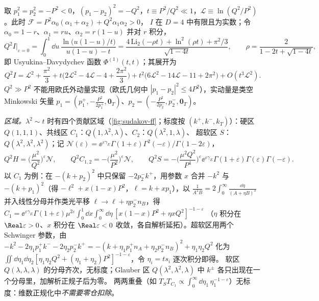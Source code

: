 \begin{example}\label{ex:sudakov-offshell}
取 $p_1^2=p_2^2=-P^2<0$，$(p_1-p_2)^2=-Q^2$，$t\equiv P^2/Q^2\ll1$，$\mathcal L\equiv\ln(Q^2/P^2)$。此时 $\mathcal F=P^2\alpha_0(\alpha_1+\alpha_2)+Q^2\alpha_1\alpha_2>0$，
$I$ 在 $D=4$ 中有限且为实数；令 $\alpha_0=1-r$、$\alpha_1=ru$、$\alpha_2=r(1-u)$ 并对 $r$ 积分，
\begin{equation}\label{eq:sudakov-offshell-exact}
Q^2I\big|_{\varepsilon=0}=\int_0^1\!\dd u\,\frac{\ln\big(u(1-u)/t\big)}{u(1-u)-t}
=\frac{4\,\mathrm{Li}_2(-\rho t)+\ln^2(\rho t)+\pi^2/3}{\sqrt{1-4t}},\qquad\rho=\frac{2}{1-2t+\sqrt{1-4t}},
\end{equation}
即 Usyukina--Davydychev 函数 $\Phi^{(1)}(t,t)$\cite{UsyukinaDavydychev1993a}；其展开为
\begin{equation}\label{eq:sudakov-offshell-nlp}
Q^2I=\mathcal L^2+\frac{\pi^2}3+t\Big(2\mathcal L^2-4\mathcal L-4+\frac{2\pi^2}3\Big)+t^2\big(6\mathcal L^2-14\mathcal L-11+2\pi^2\big)+O(t^3\mathcal L^2).
\end{equation}
$Q^2\gg P^2$ 不能用欧氏外动量实现（欧氏几何中 $|p_1-p_2|^2\le4P^2$），实动量是类空 Minkowski 矢量 $p_1=(p_1^+,-\frac{P^2}{2p_1^+},\mathbf 0_T)$、$p_2=(-\frac{P^2}{2p_2^-},p_2^-,\mathbf 0_T)$。

\emph{区域。}$\lambda^2\sim t$ 时有四个贡献区域（\cref{fig:sudakov-ff}；标度按 $(k^+,k^-,k_T)$）：硬区 $Q(1,1,1)$、共线区 $C_1$：$Q(1,\lambda^2,\lambda)$、$C_2$：$Q(\lambda^2,1,\lambda)$、
超软区 $S$：$Q(\lambda^2,\lambda^2,\lambda^2)$；记 $\mathcal N(\varepsilon)=\ee^{\varepsilon\gamma_E}\Gamma(1+\varepsilon)\Gamma^2(-\varepsilon)/\Gamma(1-2\varepsilon)$，
\begin{equation}\label{eq:sudakov-regions}
Q^2H=\Big(\frac{\mu^2}{Q^2}\Big)^{\varepsilon}\mathcal N,\qquad Q^2C_{1,2}=-\Big(\frac{\mu^2}{P^2}\Big)^{\varepsilon}\mathcal N,\qquad
Q^2S=-\Big(\frac{\mu^2Q^2}{P^4}\Big)^{\varepsilon}\ee^{\varepsilon\gamma_E}\Gamma(1+\varepsilon)\Gamma(\varepsilon)\Gamma(-\varepsilon).
\end{equation}
以 $C_1$ 为例：在 $-(k+p_2)^2$ 中只保留 $-2p_2^-k^+$，用参数 $x$ 合并 $-k^2$ 与 $-(k+p_1)^2$（得 $-\ell^2+x(1-x)P^2$，$\ell=k+xp_1$），以 $\frac{1}{A^2B}=2\int_0^\infty\frac{\dd\eta}{(A+\eta B)^3}$
并入线性分母并作类光平移 $\ell\to\ell+\eta p_2^-n_B$，得 $C_1=\ee^{\varepsilon\gamma_E}\Gamma(1+\varepsilon)\mu^{2\varepsilon}\int_0^1\!\dd x\int_0^\infty\!\dd\eta\,[x(1-x)P^2+\eta xQ^2]^{-1-\varepsilon}$
（$\eta$ 积分在 $\Real\varepsilon>0$、$x$ 积分在 $\Real\varepsilon<0$ 收敛，各自解析延拓）。超软区用两个 Schwinger 参数，由
$-k^2-2\eta_1p_1^+k^--2\eta_2p_2^-k^+=-(k+\eta_1p_1^+n_A+\eta_2p_2^-n_B)^2+\eta_1\eta_2Q^2$ 化为 $\iint\dd\eta_1\dd\eta_2[\eta_1\eta_2Q^2+(\eta_1+\eta_2)P^2]^{-1-\varepsilon}$，令 $\eta_i=ts_i$ 逐次积分即得。
软区 $Q(\lambda,\lambda,\lambda)$ 的分母齐次，无标度；Glauber 区 $Q(\lambda^2,\lambda^2,\lambda)$ 中 $k^\pm$ 各只出现在一个分母里，加解析正规子后为零。
两两重叠（如 $T_ST_{C_1}\propto\int_0^\infty\dd\eta_1\,\eta_1^{-1-\varepsilon}$）无标度：维数正规化中\emph{不需要零仓扣除}。


\end{example}
